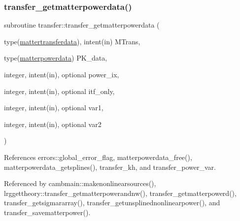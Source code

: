 \subsubsection{\texorpdfstring{transfer\+\_\+getmatterpowerdata()}{transfer\_getmatterpowerdata()}}
{\footnotesize\ttfamily subroutine transfer\+::transfer\+\_\+getmatterpowerdata (\begin{DoxyParamCaption}\item[{type(\mbox{\hyperlink{structtransfer_1_1mattertransferdata}{mattertransferdata}}), intent(in)}]{M\+Trans,  }\item[{type(\mbox{\hyperlink{structtransfer_1_1matterpowerdata}{matterpowerdata}})}]{P\+K\+\_\+data,  }\item[{integer, intent(in), optional}]{power\+\_\+ix,  }\item[{integer, intent(in), optional}]{itf\+\_\+only,  }\item[{integer, intent(in), optional}]{var1,  }\item[{integer, intent(in), optional}]{var2 }\end{DoxyParamCaption})}



References errors\+::global\+\_\+error\+\_\+flag, matterpowerdata\+\_\+free(), matterpowerdata\+\_\+getsplines(), transfer\+\_\+kh, and transfer\+\_\+power\+\_\+var.



Referenced by cambmain\+::makenonlinearsources(), lrggettheory\+::transfer\+\_\+getmatterpowerandnw(), transfer\+\_\+getmatterpowerd(), transfer\+\_\+getsigmararray(), transfer\+\_\+getunsplinednonlinearpower(), and transfer\+\_\+savematterpower().

